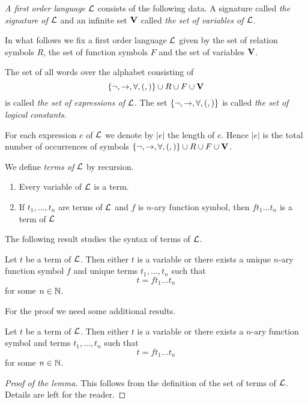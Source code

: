 \begin{definition}
\textit{A first order language ${\mathcal L}$} consists of the following data. A signature called \textit{the signature of ${\mathcal L}$} and an infinite set $\mathbf{V}$ called \textit{the set of variables of ${\mathcal L}$}.
\end{definition}
\noindent
In what follows we fix a first order language ${\mathcal L}$ given by the set of relation symbols $R$, the set of function symbols $F$ and the set of variables $\mathbf{V}$.

\begin{definition}
The set of all words over the alphabet consisting of
$$\{\neg, \rightarrow, \forall, (, )\} \cup R \cup F \cup \mathbf{V}$$
is called \textit{the set of expressions of ${\mathcal L}$}. The set $\{\neg, \rightarrow, \forall, (, )\}$ is called \textit{the set of logical constants}.
\end{definition}
\noindent
For each expression $e$ of ${\mathcal L}$ we denote by $|e|$ the length of $e$. Hence $|e|$ is the total number of occurrences of symbols $\{\neg, \rightarrow, \forall, (, )\} \cup R \cup F \cup \mathbf{V}$.

\begin{definition}
We define \textit{terms of ${\mathcal L}$} by recursion.
\begin{enumerate}[label=\textbf{(\arabic*)}, leftmargin=3.0em]
\item Every variable of ${\mathcal L}$ is a term.
\item If $t_1,...,t_n$ are terms of ${\mathcal L}$ and $f$ is $n$-ary function symbol, then $ft_1...t_n$ is a term of ${\mathcal L}$
\end{enumerate}
\end{definition}
\noindent
The following result studies the syntax of terms of ${\mathcal L}$.

\begin{theorem}\label{theorem:unique_readebility_of_terms}
Let $t$ be a term of ${\mathcal L}$. Then either $t$ is a variable or there exists a unique $n$-ary function symbol $f$ and unique terms $t_1,...,t_n$ such that
$$t = ft_1...t_n$$
for some $n \in {\mathbb N}$.
\end{theorem}
\noindent
For the proof we need some additional results.

\begin{lemma}\label{lemma:term_presentation}
Let $t$ be a term of ${\mathcal L}$. Then either $t$ is a variable or there exists a $n$-ary function symbol
and terms $t_1,...,t_n$ such that
$$t = ft_1...t_n$$
for some $n\in{\mathbb N}$.
\end{lemma}
\begin{proof}[Proof of the lemma]
This follows from the definition of the set of terms of ${\mathcal L}$. Details are left for the
reader.
\end{proof}

